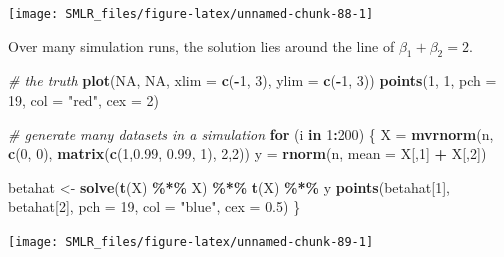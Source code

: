 \documentclass[
]{book}
\newenvironment{Shaded}{\begin{snugshade}}{\end{snugshade}}
\newcommand{\AttributeTok}[1]{\textcolor[rgb]{0.13,0.29,0.53}{#1}}
\newcommand{\CommentTok}[1]{\textcolor[rgb]{0.56,0.35,0.01}{\textit{#1}}}
\newcommand{\ConstantTok}[1]{\textcolor[rgb]{0.56,0.35,0.01}{#1}}
\newcommand{\ControlFlowTok}[1]{\textcolor[rgb]{0.13,0.29,0.53}{\textbf{#1}}}
\newcommand{\DecValTok}[1]{\textcolor[rgb]{0.00,0.00,0.81}{#1}}
\newcommand{\FloatTok}[1]{\textcolor[rgb]{0.00,0.00,0.81}{#1}}
\newcommand{\FunctionTok}[1]{\textcolor[rgb]{0.13,0.29,0.53}{\textbf{#1}}}
\newcommand{\NormalTok}[1]{#1}
\newcommand{\OtherTok}[1]{\textcolor[rgb]{0.56,0.35,0.01}{#1}}
\newcommand{\SpecialCharTok}[1]{\textcolor[rgb]{0.81,0.36,0.00}{\textbf{#1}}}
\newcommand{\StringTok}[1]{\textcolor[rgb]{0.31,0.60,0.02}{#1}}
\theoremstyle{definition}
\theoremstyle{definition}
\theoremstyle{definition}
\theoremstyle{definition}
\theoremstyle{remark}
\begin{document}
\begin{center}\texttt{[image: SMLR\_files/figure-latex/unnamed-chunk-88-1]} \end{center}

Over many simulation runs, the solution lies around the line of \(\beta_1 + \beta_2 = 2\).

\begin{Shaded}
\begin{Highlighting}[]
  \CommentTok{\# the truth}
  \FunctionTok{plot}\NormalTok{(}\ConstantTok{NA}\NormalTok{, }\ConstantTok{NA}\NormalTok{, }\AttributeTok{xlim =} \FunctionTok{c}\NormalTok{(}\SpecialCharTok{{-}}\DecValTok{1}\NormalTok{, }\DecValTok{3}\NormalTok{), }\AttributeTok{ylim =} \FunctionTok{c}\NormalTok{(}\SpecialCharTok{{-}}\DecValTok{1}\NormalTok{, }\DecValTok{3}\NormalTok{))}
  \FunctionTok{points}\NormalTok{(}\DecValTok{1}\NormalTok{, }\DecValTok{1}\NormalTok{, }\AttributeTok{pch =} \DecValTok{19}\NormalTok{, }\AttributeTok{col =} \StringTok{"red"}\NormalTok{, }\AttributeTok{cex =} \DecValTok{2}\NormalTok{)}
  
  \CommentTok{\# generate many datasets in a simulation }
  \ControlFlowTok{for}\NormalTok{ (i }\ControlFlowTok{in} \DecValTok{1}\SpecialCharTok{:}\DecValTok{200}\NormalTok{)}
\NormalTok{  \{}
\NormalTok{    X }\OtherTok{=} \FunctionTok{mvrnorm}\NormalTok{(n, }\FunctionTok{c}\NormalTok{(}\DecValTok{0}\NormalTok{, }\DecValTok{0}\NormalTok{), }\FunctionTok{matrix}\NormalTok{(}\FunctionTok{c}\NormalTok{(}\DecValTok{1}\NormalTok{,}\FloatTok{0.99}\NormalTok{, }\FloatTok{0.99}\NormalTok{, }\DecValTok{1}\NormalTok{), }\DecValTok{2}\NormalTok{,}\DecValTok{2}\NormalTok{))}
\NormalTok{    y }\OtherTok{=} \FunctionTok{rnorm}\NormalTok{(n, }\AttributeTok{mean =}\NormalTok{ X[,}\DecValTok{1}\NormalTok{] }\SpecialCharTok{+}\NormalTok{ X[,}\DecValTok{2}\NormalTok{])}
    
\NormalTok{    betahat }\OtherTok{\textless{}{-}} \FunctionTok{solve}\NormalTok{(}\FunctionTok{t}\NormalTok{(X) }\SpecialCharTok{\%*\%}\NormalTok{ X) }\SpecialCharTok{\%*\%} \FunctionTok{t}\NormalTok{(X) }\SpecialCharTok{\%*\%}\NormalTok{ y}
    \FunctionTok{points}\NormalTok{(betahat[}\DecValTok{1}\NormalTok{], betahat[}\DecValTok{2}\NormalTok{], }\AttributeTok{pch =} \DecValTok{19}\NormalTok{, }\AttributeTok{col =} \StringTok{"blue"}\NormalTok{, }\AttributeTok{cex =} \FloatTok{0.5}\NormalTok{)}
\NormalTok{  \}}
\end{Highlighting}
\end{Shaded}

\begin{center}\texttt{[image: SMLR\_files/figure-latex/unnamed-chunk-89-1]} \end{center}
\end{document}
